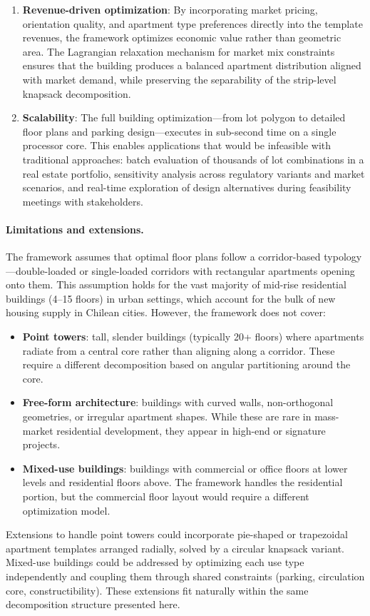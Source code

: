 \documentclass[11pt,a4paper]{article}
\begin{document}
\begin{enumerate}
    \item \textbf{Revenue-driven optimization}: By incorporating market
    pricing, orientation quality, and apartment type preferences
    directly into the template revenues, the framework optimizes
    economic value rather than geometric area. The Lagrangian relaxation
    mechanism for market mix constraints ensures that the building
    produces a balanced apartment distribution aligned with market demand,
    while preserving the separability of the strip-level knapsack
    decomposition.

    \item \textbf{Scalability}: The full building optimization---from
    lot polygon to detailed floor plans and parking design---executes
    in sub-second time on a single processor core. This enables
    applications that would be infeasible with traditional approaches:
    batch evaluation of thousands of lot combinations in a real estate
    portfolio, sensitivity analysis across regulatory variants and
    market scenarios, and real-time exploration of design alternatives
    during feasibility meetings with stakeholders.
\end{enumerate}

\paragraph{Limitations and extensions.}
The framework assumes that optimal floor plans follow a corridor-based
typology---double-loaded or single-loaded corridors with rectangular
apartments opening onto them. This assumption holds for the vast
majority of mid-rise residential buildings (4--15 floors) in urban
settings, which account for the bulk of new housing supply in Chilean
cities. However, the framework does not cover:
\begin{itemize}[nosep]
    \item \textbf{Point towers}: tall, slender buildings (typically 20+
    floors) where apartments radiate from a central core rather than
    aligning along a corridor. These require a different decomposition
    based on angular partitioning around the core.
    \item \textbf{Free-form architecture}: buildings with curved walls,
    non-orthogonal geometries, or irregular apartment shapes. While
    these are rare in mass-market residential development, they appear
    in high-end or signature projects.
    \item \textbf{Mixed-use buildings}: buildings with commercial or
    office floors at lower levels and residential floors above. The
    framework handles the residential portion, but the commercial floor
    layout would require a different optimization model.
\end{itemize}

Extensions to handle point towers could incorporate pie-shaped or
trapezoidal apartment templates arranged radially, solved by a
circular knapsack variant. Mixed-use buildings could be addressed by
optimizing each use type independently and coupling them through
shared constraints (parking, circulation core, constructibility).
These extensions fit naturally within the same decomposition structure
presented here.
\end{document}

